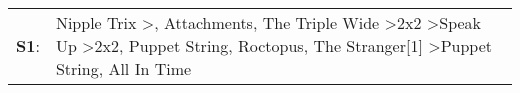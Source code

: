 \begin{supertabular}{p{0.03\textwidth}p{0.92\textwidth}}
 \textbf{S1}:  &  Nipple Trix\textsuperscript{} \textgreater {}\textsuperscript{}, \enspace Attachments\textsuperscript{}, \enspace The Triple Wide\textsuperscript{} \textgreater \enspace 2x2\textsuperscript{} \textgreater \enspace Speak Up\textsuperscript{} \textgreater \enspace 2x2\textsuperscript{}, \enspace Puppet String\textsuperscript{}, \enspace Roctopus\textsuperscript{}, \enspace The Stranger[1]\textsuperscript{} \textgreater \enspace Puppet String\textsuperscript{}, \enspace All In Time\textsuperscript{}  \enspace  \\
\end{supertabular}
